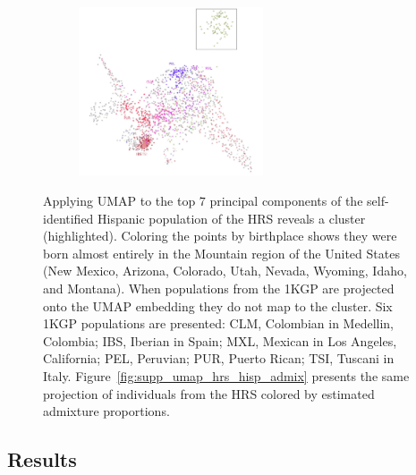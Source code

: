 \documentclass[12pt]{pnas-new}
\begin{document}
\begin{figure}
    \centering
    \begin{subfigure}{\textwidth}
    \includegraphics[width=0.6\textwidth]{images/HRS_1000G_NP1_UMAP_PC7_NC2_NN15_MD05_pca_hrshisp_added1kgp_2018115153245_1kgp_hisp.pdf}
    \end{subfigure}
    \caption{Applying UMAP to the top $7$ principal components of the self-identified Hispanic population of the HRS reveals a cluster (highlighted). Coloring the points by birthplace shows they were born almost entirely in the Mountain region of the United States (New Mexico, Arizona, Colorado, Utah, Nevada, Wyoming, Idaho, and Montana). When populations from the 1KGP are projected onto the UMAP embedding they do not map to the cluster. Six 1KGP populations are presented:
    CLM, Colombian in Medellin, Colombia;
    IBS, Iberian in Spain;
    MXL, Mexican in Los Angeles, California;
    PEL, Peruvian;
    PUR, Puerto Rican;
    TSI, Tuscani in Italy. Figure~\ref{fig:supp_umap_hrs_hisp_admix} presents the same projection of individuals from the HRS colored by estimated admixture proportions.}
    \label{fig:supp_umap_hrs_hisp_1kgp_hisp}
\end{figure}

\subsection*{Results}
\end{document}
